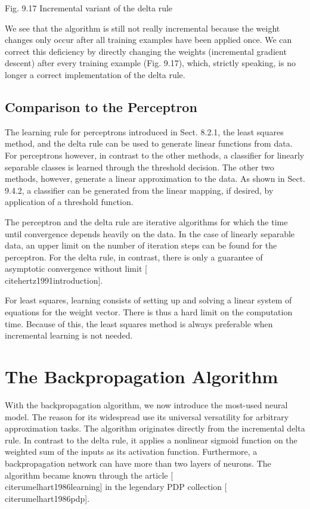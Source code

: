 \documentclass[10pt]{book}
\begin{document}
Fig. 9.17 Incremental variant of the delta rule

We see that the algorithm is still not really incremental because the weight changes only occur after all training examples have been applied once. We can correct this deficiency by directly changing the weights (incremental gradient descent) after every training example (Fig. 9.17), which, strictly speaking, is no longer a correct implementation of the delta rule.


\subsection{Comparison to the Perceptron}
The learning rule for perceptrons introduced in Sect. 8.2.1, the least squares method, and the delta rule can be used to generate linear functions from data. For perceptrons however, in contrast to the other methods, a classifier for linearly separable classes is learned through the threshold decision. The other two methods, however, generate a linear approximation to the data. As shown in Sect. 9.4.2, a classifier can be generated from the linear mapping, if desired, by application of a threshold function.

The perceptron and the delta rule are iterative algorithms for which the time until convergence depends heavily on the data. In the case of linearly separable data, an upper limit on the number of iteration steps can be found for the perceptron. For the delta rule, in contrast, there is only a guarantee of asymptotic convergence without limit [\\cite{hertz1991introduction}].

For least squares, learning consists of setting up and solving a linear system of equations for the weight vector. There is thus a hard limit on the computation time. Because of this, the least squares method is always preferable when incremental learning is not needed.

\section{The Backpropagation Algorithm}
With the backpropagation algorithm, we now introduce the most-used neural model. The reason for its widespread use its universal versatility for arbitrary approximation tasks. The algorithm originates directly from the incremental delta rule. In contrast to the delta rule, it applies a nonlinear sigmoid function on the weighted sum of the inputs as its activation function. Furthermore, a backpropagation network can have more than two layers of neurons. The algorithm became known through the article [\\cite{rumelhart1986learning}] in the legendary PDP collection [\\cite{rumelhart1986pdp}].
\end{document}
